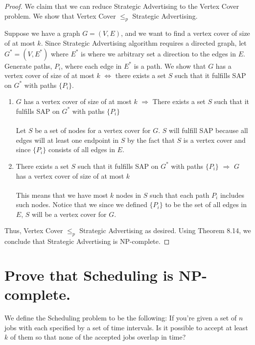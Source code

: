 \documentclass[11pt]{scrartcl}
\begin{document}
\begin{proof}
	We claim that we can reduce Strategic Advertising to the Vertex Cover problem.
	We show that Vertex Cover $\leq_p$ Strategic Advertising.

	Suppose we have a graph $G=(V,E)$, and we want to find a vertex cover of size of at most $k$.
	Since Strategic Advertising algorithm requires a directed graph, let $G^*=(V,E^*)$
	where $E^*$ is where we arbitrary set a direction to the edges in $E$. Generate paths,
	$P_i$, where each edge in $E^*$ is a path.
	We show that $G$ has a vertex cover of size of at most $k$ $\Leftrightarrow$
	there exists a set $S$ such that it fulfills SAP on $G^*$ with paths $\{P_i\}$.

	\begin{enumerate}[label=\roman*.]
		\item {
		      $G$ has a vertex cover of size of at most $k$ $\Rightarrow$
			  There exists a set $S$ such that it fulfills SAP on $G^*$ with paths $\{P_i\}$\\\-\\
			  Let $S$ be a set of nodes for a vertex cover for $G$.
			  $S$ will fulfill SAP because all edges will at least one endpoint in $S$ by the 
			  fact that $S$ is a vertex cover and since $\{P_i\}$ consists of all edges in $E$.
		      }
		\item {
		      There exists a set $S$ such that it fulfills SAP on $G^*$ with paths $\{P_i\}$
			  $\Rightarrow$ $G$ has a vertex cover of size of at most $k$\\\-\\
			  This means that we have most $k$ nodes in $S$ such that each path $P_i$ includes
			  such nodes. Notice that we since we defined $\{P_i\}$ to be the set of all edges in $E$,
			  $S$ will be a vertex cover for $G$.

		      }
	\end{enumerate}
	Thus, Vertex Cover $\leq_p$ Strategic Advertising as desired.
	Using Theorem 8.14, we conclude that Strategic Advertising is NP-complete.
\end{proof}






\pagebreak



\section{
  Prove that Scheduling is NP-complete.
 }
 We define the Scheduling problem to be the following:
 If you’re given a set of $n$ jobs with each specified by a set of time
 intervals. Is it possible to accept at least $k$ of them so that none of the accepted jobs
 overlap in time? 
\end{document}
